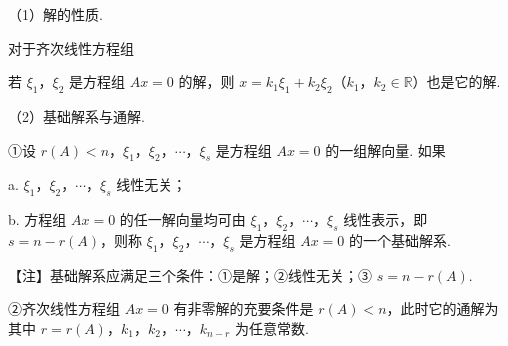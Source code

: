 %





（1）解的性质.

对于齐次线性方程组

若 $\xi_1$，$\xi_2$ 是方程组 $Ax=0$ 的解，则 $x=k_1\xi_1+k_2\xi_2$（$k_1$，$k_2\in\mathbb{R}$）也是它的解.

（2）基础解系与通解.

①设 $r(A)<n$，$\xi_1$，$\xi_2$，$\cdots$，$\xi_s$ 是方程组 $Ax=0$ 的一组解向量. 如果

a. $\xi_1$，$\xi_2$，$\cdots$，$\xi_s$ 线性无关；

b. 方程组 $Ax=0$ 的任一解向量均可由 $\xi_1$，$\xi_2$，$\cdots$，$\xi_s$ 线性表示，即 $s=n-r(A)$，则称 $\xi_1$，$\xi_2$，$\cdots$，$\xi_s$ 是方程组 $Ax=0$ 的一个基础解系.


\begin{fnote}
【注】基础解系应满足三个条件：①是解；②线性无关；③ $s=n-r(A)$.
\end{fnote}

②齐次线性方程组 $Ax=0$ 有非零解的充要条件是 $r(A)<n$，此时它的通解为
其中 $r=r(A)$，$k_1$，$k_2$，$\cdots$，$k_{n-r}$ 为任意常数.

